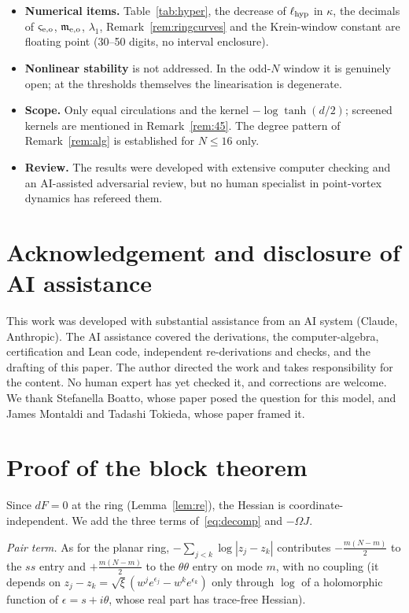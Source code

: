 \documentclass[11pt]{article}
\theoremstyle{definition}
\theoremstyle{remark}
\begin{document}
\begin{itemize}
Lemmas~\ref{lem:Rbounds}--\ref{lem:C2} are by hand and checked in the certificate.
\item \textbf{Numerical items.} Table~\ref{tab:hyper}, the decrease of $\ell_{\rm hyp}$ in $\kappa$, the decimals of $\varsigma_{\rm e,o}$, $\mathfrak m_{\rm e,o}$, $\lambda_1$, Remark~\ref{rem:ringcurves}
and the Krein-window constant are floating point (30--50 digits, no interval enclosure).
\item \textbf{Nonlinear stability} is not addressed. In the odd-$N$ window it is genuinely open; at the thresholds themselves the
linearisation is degenerate.
\item \textbf{Scope.} Only equal circulations and the kernel $-\log\tanh(d/2)$; screened kernels are mentioned in Remark~\ref{rem:45}.
The degree pattern of Remark~\ref{rem:alg} is established for $N\le16$ only.
\item \textbf{Review.} The results were developed with extensive computer checking and an AI-assisted adversarial review, but no human
specialist in point-vortex dynamics has refereed them.
\end{itemize}

\section*{Acknowledgement and disclosure of AI assistance}
This work was developed with substantial assistance from an AI system (Claude, Anthropic). The AI assistance covered the derivations,
the computer-algebra, certification and Lean code, independent re-derivations and checks, and the drafting of this paper. The author
directed the work and takes responsibility for the content. No human expert has yet checked it, and corrections are welcome. We thank
Stefanella Boatto, whose paper posed the question for this model, and James Montaldi and Tadashi Tokieda, whose paper framed it.

\appendix
\section{Proof of the block theorem}\label{app:blocks}
Since $dF=0$ at the ring (Lemma~\ref{lem:re}), the Hessian is coordinate-independent. We add the three terms of~\eqref{eq:decomp} and $-\Omega J$.

\emph{Pair term.} As for the planar ring, $-\sum_{j<k}\log|z_j-z_k|$ contributes $-\frac{m(N-m)}2$ to the $ss$ entry and $+\frac{m(N-m)}2$ to the
$\theta\theta$ entry on mode $m$, with no coupling (it depends on $z_j-z_k=\sqrt\xi(w^je^{\epsilon_j}-w^ke^{\epsilon_k})$ only through
$\log$ of a holomorphic function of $\epsilon=s+i\theta$, whose real part has trace-free Hessian).
\end{document}
